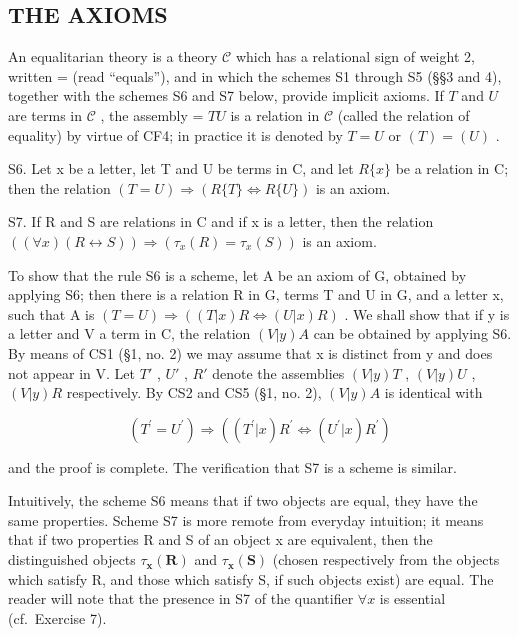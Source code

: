 \subsection{THE AXIOMS}

An equalitarian theory is a theory \(\mathcal{C}\) which has a relational sign of weight 2, written = (read ``equals''), and in which the schemes S1 through S5 (§§3 and 4), together with the schemes S6 and S7 below, provide implicit axioms. If \(T\) and \(U\) are terms in \(\mathcal{C}\) , the assembly = \(TU\) is a relation in \(\mathcal{C}\) (called the relation of equality) by virtue of CF4; in practice it is denoted by \(T = U\) or \((T) = (U)\) .

S6. Let x be a letter, let T and U be terms in C, and let \(R\{x\}\) be a relation in C; then the relation \((T = U) \Longrightarrow (R\{T\} \Longleftrightarrow R\{U\})\) is an axiom.

S7. If R and S are relations in C and if x is a letter, then the relation \(((\forall x)(R \leftrightarrow S)) \Longrightarrow (\tau_{x}(R) = \tau_{x}(S))\) is an axiom.

To show that the rule S6 is a scheme, let A be an axiom of G, obtained by applying S6; then there is a relation R in G, terms T and U in G, and a letter x, such that A is \((T=U)\Longrightarrow((T|x)R\Longleftrightarrow(U|x)R)\) . We shall show that if y is a letter and V a term in C, the relation \((V|y)A\) can be obtained by applying S6. By means of CS1 (§1, no. 2) we may assume that x is distinct from y and does not appear in V. Let \(T'\) , \(U'\) , \(R'\) denote the assemblies \((V|y)T\) , \((V|y)U\) , \((V|y)R\) respectively. By CS2 and CS5 (§1, no. 2), \((V|y)A\) is identical with

\[
(T ^ {\prime} = U ^ {\prime}) \Longrightarrow ((T ^ {\prime} | x) R ^ {\prime} \Longleftrightarrow (U ^ {\prime} | x) R ^ {\prime})
\]

and the proof is complete. The verification that S7 is a scheme is similar.

Intuitively, the scheme S6 means that if two objects are equal, they have the same properties. Scheme S7 is more remote from everyday intuition; it means that if two properties R and S of an object x are equivalent, then the distinguished objects \(\tau_{\mathbf{x}}(\mathbf{R})\) and \(\tau_{\mathbf{x}}(\mathbf{S})\) (chosen respectively from the objects which satisfy R, and those which satisfy S, if such objects exist) are equal. The reader will note that the presence in S7 of the quantifier \(\forall x\) is essential (cf.~Exercise 7).

